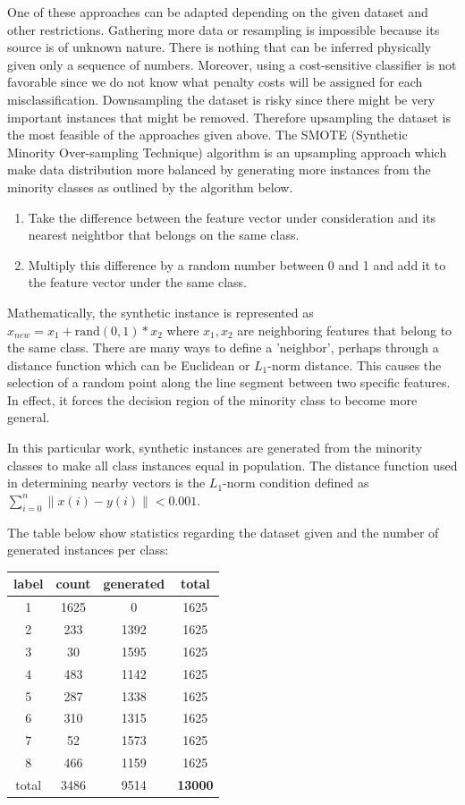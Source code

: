 \documentclass{article}
\begin{document}
One of these approaches can be adapted depending on the given dataset and other restrictions. Gathering more data or resampling is impossible because its source is of unknown nature. There is nothing that can be inferred physically given only a sequence of numbers. Moreover, using a cost-sensitive classifier is not favorable since we do not know what penalty costs will be assigned for each misclassification. Downsampling the dataset is risky since there might be very important instances that might be removed. Therefore upsampling the dataset is the most feasible of the approaches given above. The SMOTE (Synthetic Minority Over-sampling Technique) algorithm is an upsampling approach which make data distribution more balanced by generating more instances from the minority classes as outlined by the algorithm below\cite{bib:smote}.

\begin{enumerate}
	\item Take the difference between the feature vector under consideration and its nearest neightbor that belongs on the same class.
	\item Multiply this difference by a random number between 0 and 1 and add it to the feature vector under the same class.
\end{enumerate}

Mathematically, the synthetic instance is represented as $x_{new} = x_{1} + \text{rand}(0,1) * x_{2}$ where $x_{1}, x_{2}$ are neighboring features that belong to the same class. There are many ways to define a 'neighbor', perhaps through a distance function which can be Euclidean or $L_1$-norm distance. This causes the selection of a random point along the line segment between two specific features. In effect, it forces the decision region of the minority class to become more general\cite{bib:smote}.

In this particular work, synthetic instances are generated from the minority classes to make all class instances equal in population. The distance function used in determining nearby vectors is the $L_1$-norm condition defined as $\sum_{i=0}^{n} \left\| x(i) - y(i) \right\| < 0.001$.

The table below show statistics regarding the dataset given and the number of generated instances per class:

\begin{table}[H]
	\centering
	\begin{tabular}{c | c | c | c}
		label & count & generated & total\\
		\hline
		1 & 1625 & 0 & 1625\\
		2 & 233 & 1392 & 1625\\
		3 & 30 & 1595 & 1625\\
		4 & 483 & 1142 & 1625\\
		5 & 287 & 1338 & 1625\\
		6 & 310 & 1315 & 1625\\
		7 & 52 & 1573 & 1625\\
		8 & 466 & 1159 & 1625\\
		total & 3486 & 9514 & \textbf{13000}\\
	\end{tabular}
\end{table}
\end{document}
